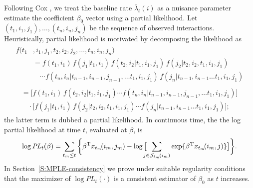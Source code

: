 \documentclass[aoas,preprint]{imsart}
\begin{document}
Following Cox \cite{cox1975partial}, we treat the baseline rate
$\bar \lambda_t(i)$ as a nuisance parameter estimate the coefficient
$\beta_0$ vector using a partial likelihood.  Let
$(t_1, i_1, j_1), \ldots, (t_n, i_n, j_n)$ be the sequence of observed
interactions.  Heuristically, partial likelihood is motivated by decomposing 
the likelihood as
\begin{align*}
    \begin{split}
    f(t_1&, i_1, j_1, t_2, i_2, j_2, \ldots, t_n, i_n, j_n) \\
        &=
            f(t_1, i_1)
            \, f(j_1 | t_1, i_1)
            \, f(t_2, i_2 | t_1, i_1, j_1)
            \, f(j_2 | t_2, i_2, t_1, i_1, j_1) \\
        &\quad \cdots
            f(t_n, i_n | t_{n-1}, i_{n-1}, j_{n-1}, \ldots t_1, i_1, j_1)
            \, f(j_n | t_{n-1}, i_{n-1} \ldots t_1, i_1, j_1)
    \end{split} \\
    \begin{split}
        &=
            \Big[
                f(t_1, i_1)
                \, f(t_2, i_2 | t_1, i_1, j_1)
                \cdots
                f(t_n, i_n | t_{n-1}, i_{n-1}, j_{n-1}, \ldots t_1, i_1, j_1)
            \Big] \\
        &\quad
            \cdot
            \Big[
                f(j_1 | t_1, i_1)
                \, f(j_2 | t_2, i_2, t_1, i_1, j_1)
                \cdots
                f(j_n | t_{n-1}, i_{n-1} \ldots t_1, i_1, j_1)
            \Big];
    \end{split}
\end{align*}
the latter term is dubbed a partial likelihood.  In continuous time, the
the log partial likelihood at time $t$, evaluated at $\beta$, is
\begin{equation}\label{E:log-pl}
    \log
    \mathit{PL}_t(\beta)
        =
        \sum_{t_m \leq t}
        \bigg\{
            \beta^\trans x_{t_m}\!(i_m, j_m)
            -
            \log\big[
                \!\!\!\!
                \sum_{j \in \mathcal{J}_{t_m}\!(i_m)}
                    \exp\{ \beta^\trans x_{t_m}\!(i_m, j)\}
            \big]
        \bigg\}.
\end{equation}
In Section~\ref{S:MPLE-consistency} we prove under suitable regularity
conditions that the maximizer of $\log \mathit{PL}_t(\cdot)$ is a
consistent estimator of $\beta_0$ as $t$ increases.
\end{document}
